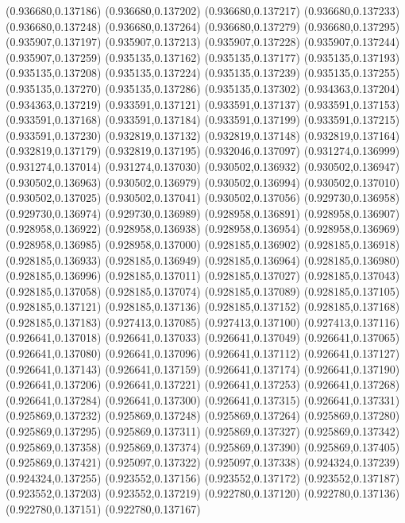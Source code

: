 (0.936680,0.137186)
(0.936680,0.137202)
(0.936680,0.137217)
(0.936680,0.137233)
(0.936680,0.137248)
(0.936680,0.137264)
(0.936680,0.137279)
(0.936680,0.137295)
(0.935907,0.137197)
(0.935907,0.137213)
(0.935907,0.137228)
(0.935907,0.137244)
(0.935907,0.137259)
(0.935135,0.137162)
(0.935135,0.137177)
(0.935135,0.137193)
(0.935135,0.137208)
(0.935135,0.137224)
(0.935135,0.137239)
(0.935135,0.137255)
(0.935135,0.137270)
(0.935135,0.137286)
(0.935135,0.137302)
(0.934363,0.137204)
(0.934363,0.137219)
(0.933591,0.137121)
(0.933591,0.137137)
(0.933591,0.137153)
(0.933591,0.137168)
(0.933591,0.137184)
(0.933591,0.137199)
(0.933591,0.137215)
(0.933591,0.137230)
(0.932819,0.137132)
(0.932819,0.137148)
(0.932819,0.137164)
(0.932819,0.137179)
(0.932819,0.137195)
(0.932046,0.137097)
(0.931274,0.136999)
(0.931274,0.137014)
(0.931274,0.137030)
(0.930502,0.136932)
(0.930502,0.136947)
(0.930502,0.136963)
(0.930502,0.136979)
(0.930502,0.136994)
(0.930502,0.137010)
(0.930502,0.137025)
(0.930502,0.137041)
(0.930502,0.137056)
(0.929730,0.136958)
(0.929730,0.136974)
(0.929730,0.136989)
(0.928958,0.136891)
(0.928958,0.136907)
(0.928958,0.136922)
(0.928958,0.136938)
(0.928958,0.136954)
(0.928958,0.136969)
(0.928958,0.136985)
(0.928958,0.137000)
(0.928185,0.136902)
(0.928185,0.136918)
(0.928185,0.136933)
(0.928185,0.136949)
(0.928185,0.136964)
(0.928185,0.136980)
(0.928185,0.136996)
(0.928185,0.137011)
(0.928185,0.137027)
(0.928185,0.137043)
(0.928185,0.137058)
(0.928185,0.137074)
(0.928185,0.137089)
(0.928185,0.137105)
(0.928185,0.137121)
(0.928185,0.137136)
(0.928185,0.137152)
(0.928185,0.137168)
(0.928185,0.137183)
(0.927413,0.137085)
(0.927413,0.137100)
(0.927413,0.137116)
(0.926641,0.137018)
(0.926641,0.137033)
(0.926641,0.137049)
(0.926641,0.137065)
(0.926641,0.137080)
(0.926641,0.137096)
(0.926641,0.137112)
(0.926641,0.137127)
(0.926641,0.137143)
(0.926641,0.137159)
(0.926641,0.137174)
(0.926641,0.137190)
(0.926641,0.137206)
(0.926641,0.137221)
(0.926641,0.137253)
(0.926641,0.137268)
(0.926641,0.137284)
(0.926641,0.137300)
(0.926641,0.137315)
(0.926641,0.137331)
(0.925869,0.137232)
(0.925869,0.137248)
(0.925869,0.137264)
(0.925869,0.137280)
(0.925869,0.137295)
(0.925869,0.137311)
(0.925869,0.137327)
(0.925869,0.137342)
(0.925869,0.137358)
(0.925869,0.137374)
(0.925869,0.137390)
(0.925869,0.137405)
(0.925869,0.137421)
(0.925097,0.137322)
(0.925097,0.137338)
(0.924324,0.137239)
(0.924324,0.137255)
(0.923552,0.137156)
(0.923552,0.137172)
(0.923552,0.137187)
(0.923552,0.137203)
(0.923552,0.137219)
(0.922780,0.137120)
(0.922780,0.137136)
(0.922780,0.137151)
(0.922780,0.137167)

